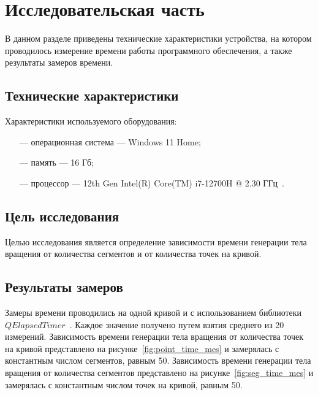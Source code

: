 \chapter{Исследовательская часть}

В данном разделе приведены технические характеристики устройства, на котором проводилось измерение времени работы программного обеспечения, а также результаты замеров времени.

\section{Технические характеристики}
Характеристики используемого оборудования:
\begin{itemize}
    \item[---] операционная система --- Windows 11 Home;
    \item[---] память --- 16 Гб;
    \item[---] процессор --- 12th Gen Intel(R) Core(TM) i7-12700H @  2.30 ГГц~\cite{intel}.
\end{itemize}

\section{Цель исследования}

Целью исследования является определение зависимости времени генерации тела вращения от количества сегментов и от количества точек на кривой.

\section{Результаты замеров}

Замеры времени  проводились на одной кривой и с использованием библиотеки $QElapsedTimer$~\cite{qelapsedtimer}. Каждое значение получено путем взятия среднего из 20 измерений. Зависимость времени генерации тела вращения от количества точек на кривой представлено на рисунке~\ref{fig:point_time_mes} и замерялась с константным числом сегментов, равным 50. Зависимость времени генерации тела вращения от количества сегментов представлено на рисунке~\ref{fig:seg_time_mes} и замерялась с константным числом точек на кривой, равным 50.

